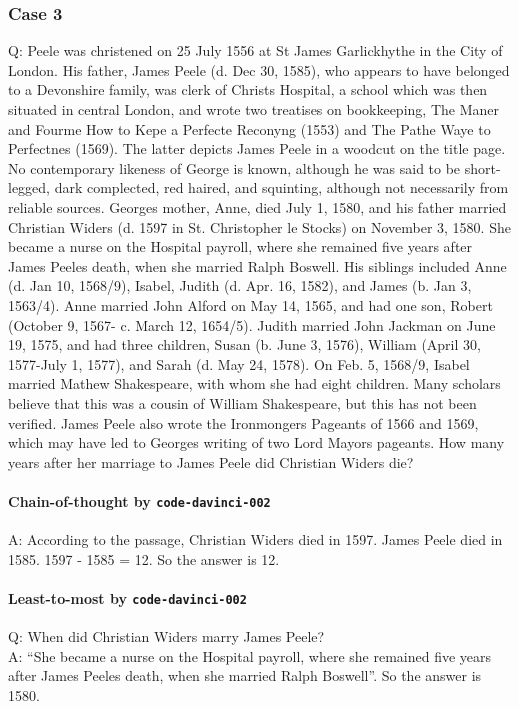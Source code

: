 \subsubsection{Case 3}
Q: Peele was christened on 25 July 1556 at St James Garlickhythe in the City of London. His father, James Peele (d. Dec 30, 1585), who appears to have belonged to a Devonshire family, was clerk of Christs Hospital, a school which was then situated in central London, and wrote two treatises on bookkeeping, The Maner and Fourme How to Kepe a Perfecte Reconyng (1553) and The Pathe Waye to Perfectnes (1569). The latter depicts James Peele in a woodcut on the title page. No contemporary likeness of George is known, although he was said to be short-legged, dark complected, red haired, and squinting, although not necessarily from reliable sources. Georges mother, Anne, died July 1, 1580, and his father married Christian Widers (d. 1597 in St. Christopher le Stocks) on November 3, 1580. She became a nurse on the Hospital payroll, where she remained five years after James Peeles death, when she married Ralph Boswell. His siblings included Anne (d. Jan 10, 1568/9),  Isabel, Judith (d. Apr. 16, 1582), and James (b. Jan 3, 1563/4).  Anne married John Alford on May 14, 1565, and had one son, Robert (October 9, 1567- c. March 12, 1654/5). Judith married John Jackman on June 19, 1575, and had three children, Susan (b. June 3, 1576), William (April 30, 1577-July 1, 1577), and Sarah (d. May 24, 1578). On Feb. 5, 1568/9, Isabel married Mathew Shakespeare, with whom she had eight children.  Many scholars believe that this was a cousin of William Shakespeare, but this has not been verified. James Peele also wrote the Ironmongers Pageants of 1566 and 1569, which may have led to Georges writing of two Lord Mayors pageants. How many years after her marriage to James Peele did Christian Widers die?

\paragraph{Chain-of-thought by \texttt{code-davinci-002}}
A: According to the passage, Christian Widers died in 1597. James Peele died in 1585. 1597 - 1585 = 12. So the answer is 12.

\paragraph{Least-to-most by \texttt{code-davinci-002}}
Q: When did Christian Widers marry James Peele?\\
A: ``She became a nurse on the Hospital payroll, where she remained five years after James Peeles death, when she married Ralph Boswell''. So the answer is 1580.

